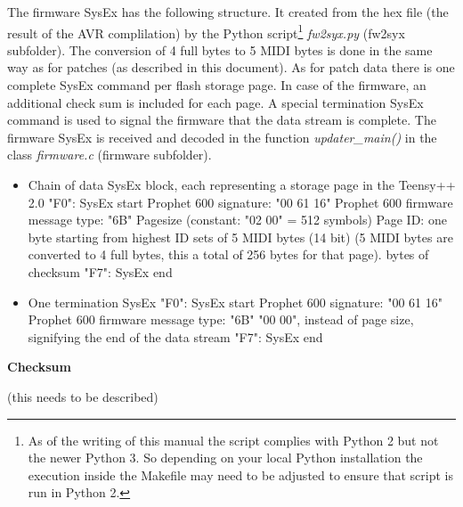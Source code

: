 The firmware SysEx has the following structure. It created from the hex file (the result of the AVR complilation) by the Python script\footnote{As of the writing of this manual the script complies with Python 2 but not the newer Python 3. So depending on your local Python installation the execution inside the Makefile may need to be adjusted to ensure that script is run in Python 2.} \textit{fw2syx.py} (fw2syx subfolder). The conversion of 4 full bytes to 5 MIDI bytes is done in the same way as for patches (as described in this document). As for patch data there is one complete SysEx command per flash storage page. In case of the firmware, an additional check sum is included for each page. A special termination SysEx command is used to signal the firmware that the data stream is complete. The firmware SysEx is received and decoded in the function \textit{updater\_main()} in the class \textit{firmware.c} (firmware subfolder). 

\begin{itemize}
  \item Chain of data SysEx block, each representing a storage page in the Teensy++ 2.0
  \subitem "F0": SysEx start
  \subitem Prophet 600 signature: "00 61 16"
  \subitem Prophet 600 firmware message type: "6B"
  \subitem Pagesize (constant: "02 00" = 512 symbols)
  \subitem Page ID: one byte starting from highest ID
   sets of 5 MIDI bytes (14 bit) (5 MIDI bytes are converted to 4 full bytes, this a total of 256 bytes for that page).
   bytes of checksum
  \subitem "F7": SysEx end
  \item One termination SysEx
  \subitem "F0": SysEx start
  \subitem Prophet 600 signature: "00 61 16"
  \subitem Prophet 600 firmware message type: "6B"
  \subitem "00 00", instead of page size, signifying the end of the data stream
  \subitem "F7": SysEx end  
\end{itemize}


\textbf{Checksum}

(this needs to be described)
